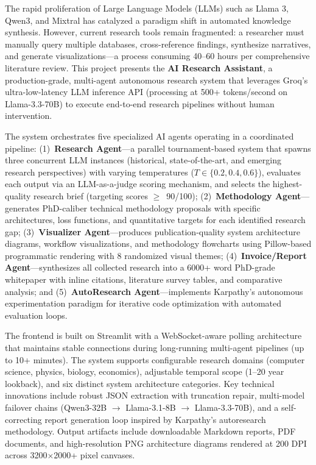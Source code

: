 The rapid proliferation of Large Language Models (LLMs) such as Llama 3, Qwen3, and Mixtral has catalyzed a paradigm shift in automated knowledge synthesis. However, current research tools remain fragmented: a researcher must manually query multiple databases, cross-reference findings, synthesize narratives, and generate visualizations---a process consuming 40--60 hours per comprehensive literature review. This project presents the \textbf{AI Research Assistant}, a production-grade, multi-agent autonomous research system that leverages Groq's ultra-low-latency LLM inference API (processing at 500+ tokens/second on Llama-3.3-70B) to execute end-to-end research pipelines without human intervention.

The system orchestrates five specialized AI agents operating in a coordinated pipeline: (1)~\textbf{Research Agent}---a parallel tournament-based system that spawns three concurrent LLM instances (historical, state-of-the-art, and emerging research perspectives) with varying temperatures ($T \in \{0.2, 0.4, 0.6\}$), evaluates each output via an LLM-as-a-judge scoring mechanism, and selects the highest-quality research brief (targeting scores $\geq$~90/100); (2)~\textbf{Methodology Agent}---generates PhD-caliber technical methodology proposals with specific architectures, loss functions, and quantitative targets for each identified research gap; (3)~\textbf{Visualizer Agent}---produces publication-quality system architecture diagrams, workflow visualizations, and methodology flowcharts using Pillow-based programmatic rendering with 8 randomized visual themes; (4)~\textbf{Invoice/Report Agent}---synthesizes all collected research into a 6000+ word PhD-grade whitepaper with inline citations, literature survey tables, and comparative analysis; and (5)~\textbf{AutoResearch Agent}---implements Karpathy's autonomous experimentation paradigm for iterative code optimization with automated evaluation loops.

The frontend is built on Streamlit with a WebSocket-aware polling architecture that maintains stable connections during long-running multi-agent pipelines (up to 10+ minutes). The system supports configurable research domains (computer science, physics, biology, economics), adjustable temporal scope (1--20 year lookback), and six distinct system architecture categories. Key technical innovations include robust JSON extraction with truncation repair, multi-model failover chains (Qwen3-32B $\rightarrow$ Llama-3.1-8B $\rightarrow$ Llama-3.3-70B), and a self-correcting report generation loop inspired by Karpathy's autoresearch methodology. Output artifacts include downloadable Markdown reports, PDF documents, and high-resolution PNG architecture diagrams rendered at 200 DPI across 3200$\times$2000+ pixel canvases.
